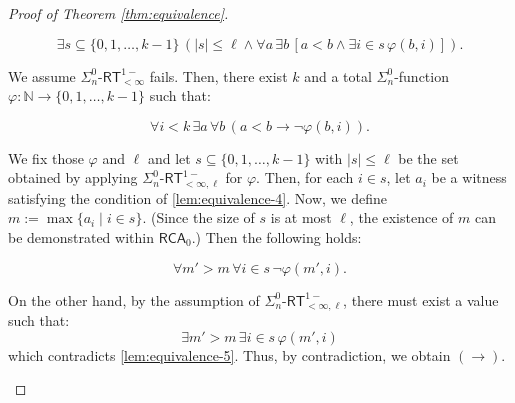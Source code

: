 \documentclass[10pt,a4paper]{amsart}
\begin{document}
\begin{proof}[Proof of Theorem \ref{thm:equivalence}]
\begin{enumerate}[label=(\roman*),topsep=0.5em,itemsep=0.5em]
\begin{equation}
\exists s \subseteq \{0,1,\dots,k-1\} \, (|s|\le\ell \land \forall a \, \exists b \, [a < b \land \exists i \in s \, \varphi(b,i)]).
\end{equation}


We assume $\Sigma_{n}^{0}\text{-}\mathsf{RT}_{<\infty}^{1-}$ fails. Then, there exist $k$ and a total $\Sigma_{n}^{0}$-function $\varphi\colon\mathbb{N}\to\{0,1,\dots,k-1\}$ such that:


\begin{equation}
\forall i < k \, \exists a \, \forall b \, (a < b \rightarrow \neg\varphi(b,i)). \label{lem:equivalence-4}
\end{equation}


We fix those $\varphi$ and $\ell$ and let $s \subseteq \{0,1,\dots,k-1\}$ with $|s|\le\ell$ be the set obtained by applying $\Sigma_{n}^{0}\text{-}\mathsf{RT}_{<\infty,\ell}^{1-}$ for $\varphi$.
Then, for each $i \in s$, let $a_i$ be a witness satisfying the condition of \eqref{lem:equivalence-4}. Now, we define $m:=\max\{a_i \mid i\in s\}$. (Since the size of $s$ is at most $\ell$, the existence of $m$ can be demonstrated within $\mathsf{RCA}_0$.)
Then the following holds:


\begin{equation}
\forall m' > m \, \forall i \in s \, \neg\varphi(m',i). \label{lem:equivalence-5}
\end{equation}


On the other hand, by the assumption of $\Sigma_{n}^{0}\text{-}\mathsf{RT}_{<\infty,\ell}^{1-}$, there must exist a value such that:
\[
\exists m' > m \, \exists i \in s \, \varphi(m',i)
\]
which contradicts \eqref{lem:equivalence-5}. Thus, by contradiction, we obtain $(\rightarrow)$.
\end{enumerate}
\end{proof}
\end{document}
